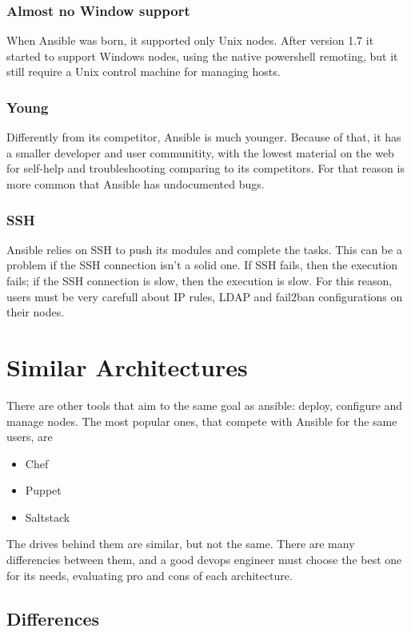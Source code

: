 \documentclass[conference]{IEEEtran}
\begin{document}
\subsubsection{Almost no Window support}
When Ansible was born, it supported only Unix nodes. After version 1.7 it started to support Windows nodes, using the native powershell remoting, but it still require a Unix control machine for managing hosts.
\subsubsection{Young}
Differently from its competitor, Ansible is much younger. Because of that, it has a smaller developer and user communitity, with the lowest material on the web for self-help and troubleshooting comparing to its competitors. For that reason is more common that Ansible has undocumented bugs. 
\subsubsection{SSH}
Ansible relies on SSH to push its modules and complete the tasks. This can be a problem if the SSH connection isn't a solid one. If SSH fails, then the execution fails; if the SSH connection is slow, then the execution is slow. For this reason, users must be very carefull about IP rules, LDAP and fail2ban configurations on their nodes.

\section{Similar Architectures}
\label{similar}
There are other tools that aim to the same goal as ansible: deploy, configure and manage nodes.
The most popular ones, that compete with Ansible for the same users, are
\begin{itemize}
    \item Chef
    \item Puppet
    \item Saltstack
\end{itemize}
The drives behind them are similar, but not the same. There are many differencies between them, and a good devops engineer must choose the best one for its needs, evaluating pro and cons of each architecture.
\subsection{Differences}
\end{document}
